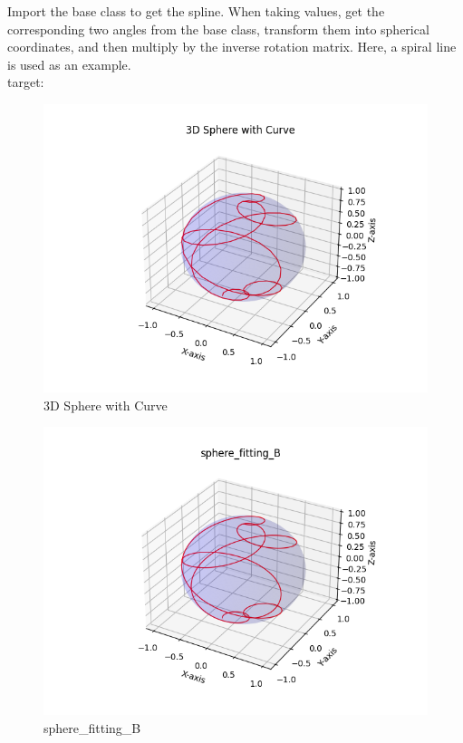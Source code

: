 \documentclass[a4paper]{article}
\begin{document}
    Import the base class to get the spline.
    When taking values, get the corresponding two angles from the base class, transform them into spherical coordinates, and then multiply by the inverse rotation matrix.
    Here, a spiral line is used as an example.\\
    target:\\
    \begin{figure}[H]
    \centering
    \includegraphics{../figure/3D Sphere with Curve.png}
    \caption{3D Sphere with Curve}
    \end{figure}
            
    \begin{figure}[H]
    \centering
    \includegraphics{../figure/sphere_fitting_B.png}
    \caption{sphere\_fitting\_B}
    \end{figure}
            
\end{document}

